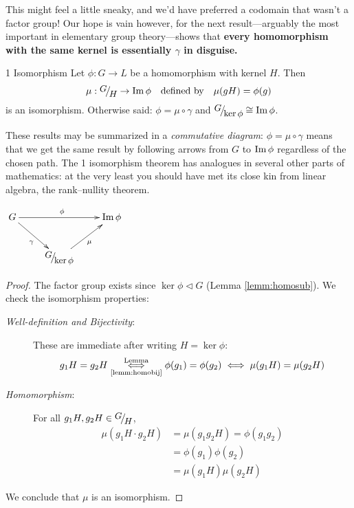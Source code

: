 This might feel a little sneaky, and we'd have preferred a codomain that wasn't a factor group! Our hope is vain however, for the next result---arguably the most important in elementary group theory---shows that \textbf{every homomorphism with the same kernel is essentially $\gamma$ in disguise.}

\begin{thm}{1\st{} Isomorphism}{}
	Let $\phi:G\to L$ be a homomorphism with kernel $H$. Then
	\[
		\mu:\quotient GH\to\image\phi
		\quad \text{defined by}\quad 
		\mu(gH)=\phi(g)
	\]
	is an isomorphism. Otherwise said: $\phi=\mu\circ\gamma$ and $\quotient G{\ker\phi}\cong\image\phi$.
\end{thm}


\begin{minipage}[t]{0.69\linewidth}\vspace{-5pt}
	These results may be summarized in a \emph{commutative diagram}: $\phi=\mu\circ\gamma$ means that we get the same result by following arrows from $G$ to $\operatorname{Im}\phi$ regardless of the chosen path.\medbreak
	The 1\st{} isomorphism theorem has analogues in several other parts of mathematics: at the very least you should have met its close kin from linear algebra, the rank--nullity theorem.
\end{minipage}
\hfill
\begin{minipage}[t]{0.3\linewidth}\vspace{-5pt}
	\flushright$\xymatrix{%
		G \ar[rr]^{\phi} \ar[dr]_\gamma && \image\phi\\
		& \quotient G{\ker\phi} \ar[ur]_{\mu} &
	}$
\end{minipage}\medbreak




\begin{proof}
	The factor group exists since $\ker\phi\triangleleft G$ (Lemma \ref{lemm:homosub}). We check the isomorphism properties:
  \begin{description}
		\item[\normalfont\emph{Well-definition and Bijectivity}:] These are immediate after writing $H=\ker\phi$:
		\[
			g_1H=g_2H
			\underset{\text{\ref{lemm:homobij}}}{\overset{\text{Lemma}}{\iff}} \phi(g_1)=\phi(g_2)
			\iff \mu(g_1H)=\mu(g_2H)
		\]
		\item[\normalfont\emph{Homomorphism}:] For all $g_1H,g_2H\in\quotient GH$,
		\begin{align*}
			\mu(g_1H\cdot g_2H)
			&=\mu(g_1g_2H)=\phi(g_1g_2)
				\tag{coset multiplication \& definition of $\mu$}\\ 
			&=\phi(g_1)\phi(g_2)
				\tag{$\phi$ is a homomorphism}\\
			&=\mu(g_1H)\mu(g_2H)
				\tag{definition of $\mu$ again}
		\end{align*}
  \end{description}
	We conclude that $\mu$ is an isomorphism.
\end{proof}


